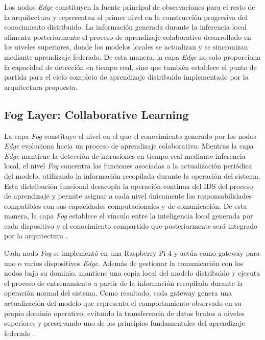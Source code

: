\documentclass[journal,article,submit,moreauthors]{Definitions/mdpi}
\begin{document}
Los nodos \textit{Edge} constituyen la fuente principal de observaciones para el resto de la arquitectura y representan el primer nivel en la construcción progresiva del conocimiento distribuido. La información generada durante la inferencia local alimenta posteriormente el proceso de aprendizaje colaborativo desarrollado en los niveles superiores, donde los modelos locales se actualizan y se sincronizan mediante aprendizaje federado. De esta manera, la capa \textit{Edge} no solo proporciona la capacidad de detección en tiempo real, sino que también establece el punto de partida para el ciclo completo de aprendizaje distribuido implementado por la arquitectura propuesta.

\subsection{Fog Layer: Collaborative Learning}
La capa \textit{Fog} constituye el nivel en el que el conocimiento generado por los nodos \textit{Edge} evoluciona hacia un proceso de aprendizaje colaborativo. Mientras la capa \textit{Edge} mantiene la detección de intrusiones en tiempo real mediante inferencia local, el nivel \textit{Fog} concentra las funciones asociadas a la actualización periódica del modelo, utilizando la información recopilada durante la operación del sistema. Esta distribución funcional desacopla la operación continua del IDS del proceso de aprendizaje y permite asignar a cada nivel únicamente las responsabilidades compatibles con sus capacidades computacionales y de comunicación. De esta manera, la capa \textit{Fog} establece el vínculo entre la inteligencia local generada por cada dispositivo y el conocimiento compartido que posteriormente será integrado por la arquitectura \cite{Ma2024,Cooray2025}.

Cada nodo \textit{Fog} se implementó en una Raspberry Pi 4 y actúa como gateway para uno o varios dispositivos \textit{Edge}. Además de gestionar la comunicación con los nodos bajo su dominio, mantiene una copia local del modelo distribuido y ejecuta el proceso de entrenamiento a partir de la información recopilada durante la operación normal del sistema. Como resultado, cada gateway genera una actualización del modelo que representa el comportamiento observado en su propio dominio operativo, evitando la transferencia de datos brutos a niveles superiores y preservando uno de los principios fundamentales del aprendizaje federado \cite{McMahan2017,Imteaj2022,Ramadan2025}.
\end{document}
